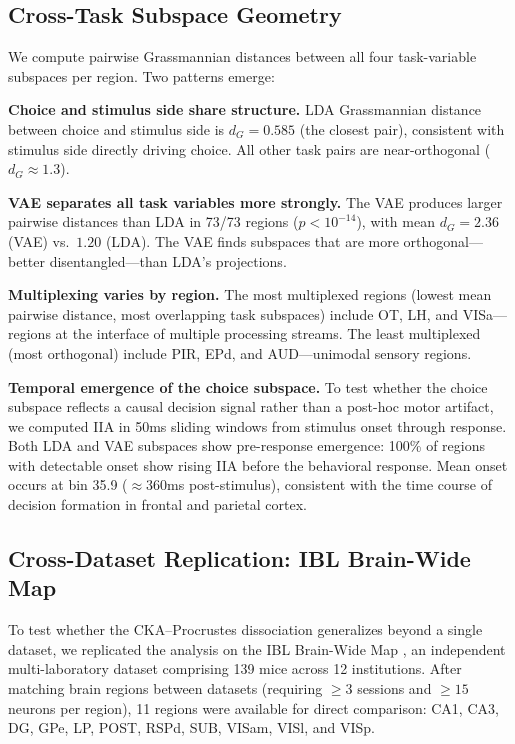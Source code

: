 \documentclass{article}
\begin{document}
\subsection{Cross-Task Subspace Geometry}

We compute pairwise Grassmannian distances between all four task-variable subspaces per region. Two patterns emerge:

\textbf{Choice and stimulus side share structure.} LDA Grassmannian distance between choice and stimulus side is $d_G = 0.585$ (the closest pair), consistent with stimulus side directly driving choice. All other task pairs are near-orthogonal ($d_G \approx 1.3$).

\textbf{VAE separates all task variables more strongly.} The VAE produces larger pairwise distances than LDA in 73/73 regions ($p < 10^{-14}$), with mean $d_G = 2.36$ (VAE) vs.\ $1.20$ (LDA). The VAE finds subspaces that are more orthogonal---better disentangled---than LDA's projections.

\textbf{Multiplexing varies by region.} The most multiplexed regions (lowest mean pairwise distance, most overlapping task subspaces) include OT, LH, and VISa---regions at the interface of multiple processing streams. The least multiplexed (most orthogonal) include PIR, EPd, and AUD---unimodal sensory regions.

\textbf{Temporal emergence of the choice subspace.} To test whether the choice subspace reflects a causal decision signal rather than a post-hoc motor artifact, we computed IIA in 50ms sliding windows from stimulus onset through response. Both LDA and VAE subspaces show pre-response emergence: 100\% of regions with detectable onset show rising IIA before the behavioral response. Mean onset occurs at bin 35.9 ($\approx 360$ms post-stimulus), consistent with the time course of decision formation in frontal and parietal cortex.

\subsection{Cross-Dataset Replication: IBL Brain-Wide Map}
\label{sec:ibl}

To test whether the CKA--Procrustes dissociation generalizes beyond a single dataset, we replicated the analysis on the IBL Brain-Wide Map \citep{ibl2025brainwide}, an independent multi-laboratory dataset comprising 139 mice across 12 institutions. After matching brain regions between datasets (requiring $\geq 3$ sessions and $\geq 15$ neurons per region), 11 regions were available for direct comparison: CA1, CA3, DG, GPe, LP, POST, RSPd, SUB, VISam, VISl, and VISp.
\end{document}
